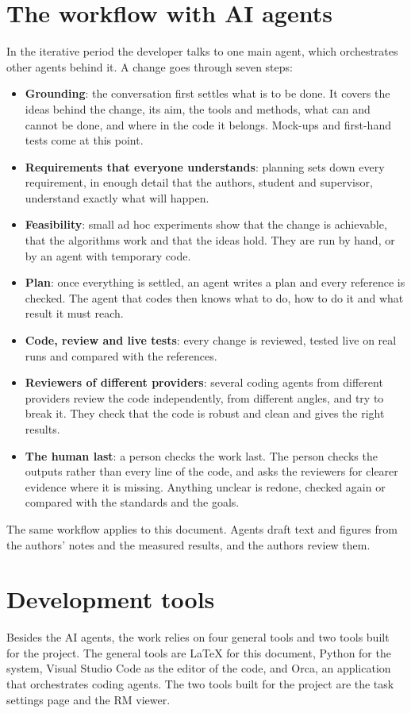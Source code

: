 \documentclass[11pt,english,listoffigures,listoftables]{tfgetsinf}
\begin{document}
\section{The workflow with AI agents}
\label{app:ai-workflow}
In the iterative period the developer talks to one main agent, which orchestrates other agents behind it. A change goes through seven steps:
\begin{itemize}
    \item \textbf{Grounding}: the conversation first settles what is to be done. It covers the ideas behind the change, its aim, the tools and methods, what can and cannot be done, and where in the code it belongs. Mock-ups and first-hand tests come at this point.
    \item \textbf{Requirements that everyone understands}: planning sets down every requirement, in enough detail that the authors, student and supervisor, understand exactly what will happen.
    \item \textbf{Feasibility}: small ad hoc experiments show that the change is achievable, that the algorithms work and that the ideas hold. They are run by hand, or by an agent with temporary code.
    \item \textbf{Plan}: once everything is settled, an agent writes a plan and every reference is checked. The agent that codes then knows what to do, how to do it and what result it must reach.
    \item \textbf{Code, review and live tests}: every change is reviewed, tested live on real runs and compared with the references.
    \item \textbf{Reviewers of different providers}: several coding agents from different providers review the code independently, from different angles, and try to break it. They check that the code is robust and clean and gives the right results.
    \item \textbf{The human last}: a person checks the work last. The person checks the outputs rather than every line of the code, and asks the reviewers for clearer evidence where it is missing. Anything unclear is redone, checked again or compared with the standards and the goals.
\end{itemize}
The same workflow applies to this document. Agents draft text and figures from the authors' notes and the measured results, and the authors review them.

\section{Development tools}
\label{app:dev-tools}
Besides the AI agents, the work relies on four general tools and two tools built for the project. The general tools are LaTeX for this document, Python for the system, Visual Studio Code as the editor of the code, and Orca, an application that orchestrates coding agents. The two tools built for the project are the task settings page and the RM viewer.
\end{document}
